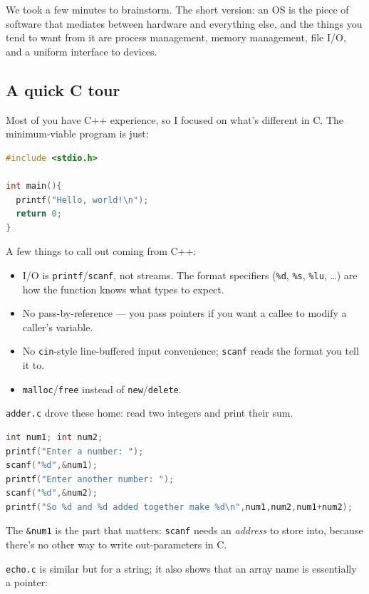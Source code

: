 \documentclass[11pt]{article}
\begin{document}
We took a few minutes to brainstorm. The short version: an OS is the
piece of software that mediates between hardware and everything else,
and the things you tend to want from it are process management,
memory management, file I/O, and a uniform interface to devices.

\subsection*{A quick C tour}

Most of you have C++ experience, so I focused on what's different in
C. The minimum-viable program is just:

\begin{lstlisting}[language=C]
#include <stdio.h>

int main(){
  printf("Hello, world!\n");
  return 0;
}
\end{lstlisting}

A few things to call out coming from C++:
\begin{itemize}
  \item I/O is \texttt{printf}/\texttt{scanf}, not streams. The
    format specifiers (\texttt{\%d}, \texttt{\%s}, \texttt{\%lu},
    \ldots) are how the function knows what types to expect.
  \item No pass-by-reference --- you pass pointers if you want a
    callee to modify a caller's variable.
  \item No \texttt{cin}-style line-buffered input convenience;
    \texttt{scanf} reads the format you tell it to.
  \item \texttt{malloc}/\texttt{free} instead of \texttt{new}/\texttt{delete}.
\end{itemize}

\texttt{adder.c} drove these home: read two integers and print their
sum.

\begin{lstlisting}[language=C]
int num1; int num2;
printf("Enter a number: ");
scanf("%d",&num1);
printf("Enter another number: ");
scanf("%d",&num2);
printf("So %d and %d added together make %d\n",num1,num2,num1+num2);
\end{lstlisting}

The \texttt{\&num1} is the part that matters: \texttt{scanf} needs an
\emph{address} to store into, because there's no other way to write
out-parameters in C.

\texttt{echo.c} is similar but for a string; it also shows that an
array name is essentially a pointer:
\end{document}

